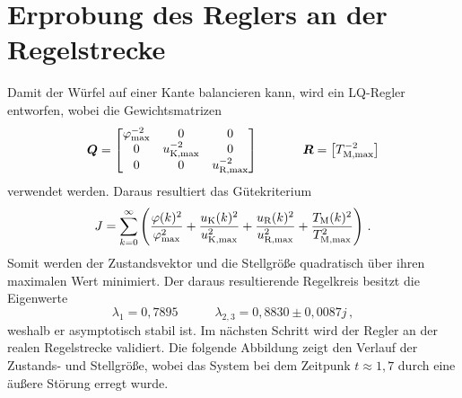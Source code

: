 \section{Erprobung des Reglers an der Regelstrecke}
Damit der Würfel auf einer Kante balancieren kann, wird ein LQ-Regler entworfen, wobei die Gewichtsmatrizen
\begin{equation}
\boldsymbol{Q} = \begin{bmatrix}
\varphi^{-2}_{\text{max}} & 0 & 0 \\
0 & u^{-2}_{\text{K,max}} & 0 \\
0 & 0 & u^{-2}_{\text{R,max}}
\end{bmatrix}
\hspace{35pt}
\boldsymbol{R} = \begin{bmatrix} T^{-2}_{\text{M,max}} \end{bmatrix}
\end{equation}
verwendet werden. Daraus resultiert das Gütekriterium
\begin{equation}
J = \sum^{\infty}_{k=0}\left( \frac{\varphi(k)^2}{\varphi^2_{\text{max}}} + \frac{u_{\text{K}}(k)^2}{u^2_{\text{K,max}}} + \frac{u_{\text{R}}(k)^2}{u^2_{\text{R,max}}} + \frac{T_{\text{M}}(k)^2}{T^2_{\text{M,max}}}\right)\,.
\end{equation}
Somit werden der Zustandsvektor und die Stellgröße quadratisch über ihren maximalen Wert minimiert. Der daraus resultierende Regelkreis besitzt die Eigenwerte
\begin{equation}
\lambda_1 = 0{,}7895 \hspace{35pt} \lambda_{2,3} = 0{,}8830 \pm 0{,}0087j\,,
\end{equation}
weshalb er asymptotisch stabil ist. Im nächsten Schritt wird der Regler an der realen Regelstrecke validiert. Die folgende Abbildung zeigt den Verlauf der Zustands- und Stellgröße, wobei das System bei dem Zeitpunk $t\approx 1{,}7$ durch eine äußere Störung erregt wurde.

